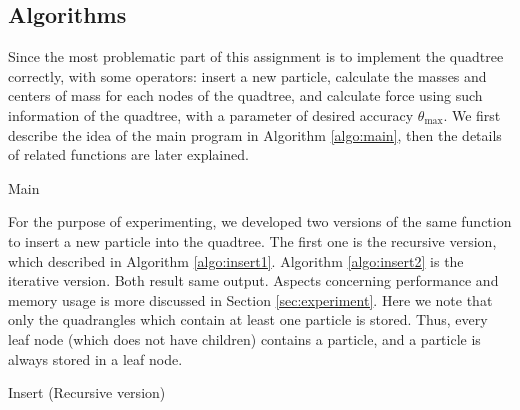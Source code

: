 \documentclass[12pt,oneside,a4paper]{article}
\begin{document}
\subsection{Algorithms}
\label{sec:algo}
Since the most problematic part of this assignment is to implement the quadtree correctly, with some operators: insert a new particle, calculate the masses and centers of mass for each nodes of the quadtree, and calculate force using such information of the quadtree, with a parameter of desired accuracy $\theta_{\max}$. We first describe the idea of the main program in Algorithm \ref{algo:main}, then the details of related functions are later explained.

\begin{algorithm}
\caption{Main}\label{algo:main}
\begin{algorithmic}[1]
	\EndFor
	\EndFor
\EndFor
{}
\EndProcedure
\end{algorithmic}
\end{algorithm}

For the purpose of experimenting, we developed two versions of the same function to insert a new particle into the quadtree. The first one is the recursive version, which described in Algorithm \ref{algo:insert1}. Algorithm \ref{algo:insert2} is the iterative version. Both result same output. Aspects concerning performance and memory usage is more discussed in Section \ref{sec:experiment}. Here we note that only the quadrangles which contain at least one particle is stored. Thus, every leaf node (which does not have children) contains a particle, and a particle is always stored in a leaf node.

\begin{algorithm}
\caption{Insert (Recursive version)}\label{algo:insert1}
\begin{algorithmic}[1]
	\Else
	\EndIf
		
\EndProcedure
\end{algorithmic}
\end{algorithm}
\end{document}
